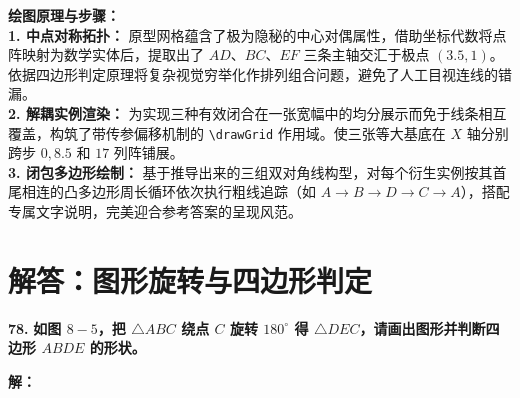 \vspace{0.4cm}
{\small\color{blue!70!black}
\textbf{绘图原理与步骤：}\\
\textbf{1. 中点对称拓扑：} 原型网格蕴含了极为隐秘的中心对偶属性，借助坐标代数将点阵映射为数学实体后，提取出了 $AD$、$BC$、$EF$ 三条主轴交汇于极点 $(3.5, 1)$。依据四边形判定原理将复杂视觉穷举化作排列组合问题，避免了人工目视连线的错漏。\\
\textbf{2. 解耦实例渲染：} 为实现三种有效闭合在一张宽幅中的均分展示而免于线条相互覆盖，构筑了带传参偏移机制的 \texttt{\textbackslash drawGrid} 作用域。使三张等大基底在 $X$ 轴分别跨步 $0, 8.5$ 和 $17$ 列阵铺展。\\
\textbf{3. 闭包多边形绘制：} 基于推导出来的三组双对角线构型，对每个衍生实例按其首尾相连的凸多边形周长循环依次执行粗线追踪（如 $A\to B\to D\to C\to A$），搭配专属文字说明，完美迎合参考答案的呈现风范。
}

\newpage


\section{解答：图形旋转与四边形判定}

\vspace{0.6cm}

\textbf{\LARGE 78.} \textbf{如图 $8-5$，把 $\triangle ABC$ 绕点 $C$ 旋转 $180^\circ$ 得 $\triangle DEC$，请画出图形并判断四边形 $ABDE$ 的形状。}

\vspace{0.4cm}
\textbf{解：}

